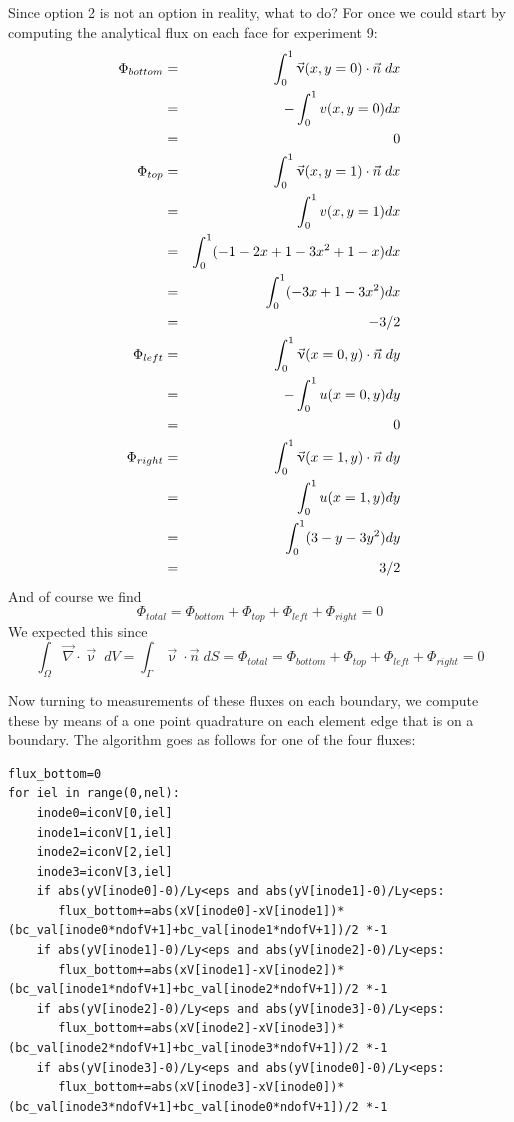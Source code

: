 Since option 2 is not an option in reality, what to do? 
For once we could start by computing the analytical flux on each face for experiment 9:
\begin{eqnarray}
\Phi_{bottom} 
&=& \int_0^1 \vec{\upnu}(x,y=0) \cdot \vec{n} \; dx \nonumber\\
&=& -\int_0^1 v(x,y=0)  dx \nonumber\\
&=& 0 \nonumber\\
\Phi_{top} 
&=& \int_0^1 \vec{\upnu}(x,y=1) \cdot \vec{n} \; dx \nonumber\\
&=& \int_0^1 v(x,y=1)  dx \nonumber\\
&=& \int_0^1 ( -1-2x+1 -3x^2 + 1 - x ) dx \nonumber\\
&=& \int_0^1 ( -3x+1 -3x^2   ) dx \nonumber\\
&=& -3/2 \nonumber\\
\Phi_{left} 
&=& \int_0^1 \vec{\upnu}(x=0,y) \cdot \vec{n} \; dy \nonumber\\
&=& -\int_0^1 u(x=0,y)  dy \nonumber\\
&=& 0 \nonumber\\
\Phi_{right} 
&=& \int_0^1 \vec{\upnu}(x=1,y) \cdot \vec{n} \; dy \nonumber\\
&=& \int_0^1 u(x=1,y)  dy \nonumber\\
&=& \int_0^1 (3  - y - 3y^2  ) dy \nonumber\\
&=& 3/2 \nonumber
\end{eqnarray}
And of course we find 
\[
\Phi_{total}=\Phi_{bottom}+\Phi_{top} +\Phi_{left}  + \Phi_{right}  =0
\] 
We expected this since
\[
\int_\Omega \vec{\nabla}\cdot \vec{\upnu} \; dV 
= \int_\Gamma \vec{\upnu} \cdot \vec{n} \; dS
=\Phi_{total}=\Phi_{bottom}+\Phi_{top} +\Phi_{left}  + \Phi_{right}  =0
\]

Now turning to measurements of these fluxes on each boundary,
we compute these by means of a one point quadrature on each 
element edge that is on a boundary.
The algorithm goes as follows for one of the four fluxes:
\begin{lstlisting}
flux_bottom=0
for iel in range(0,nel):
    inode0=iconV[0,iel]
    inode1=iconV[1,iel]
    inode2=iconV[2,iel]
    inode3=iconV[3,iel]
    if abs(yV[inode0]-0)/Ly<eps and abs(yV[inode1]-0)/Ly<eps:
       flux_bottom+=abs(xV[inode0]-xV[inode1])*(bc_val[inode0*ndofV+1]+bc_val[inode1*ndofV+1])/2 *-1
    if abs(yV[inode1]-0)/Ly<eps and abs(yV[inode2]-0)/Ly<eps:
       flux_bottom+=abs(xV[inode1]-xV[inode2])*(bc_val[inode1*ndofV+1]+bc_val[inode2*ndofV+1])/2 *-1
    if abs(yV[inode2]-0)/Ly<eps and abs(yV[inode3]-0)/Ly<eps:
       flux_bottom+=abs(xV[inode2]-xV[inode3])*(bc_val[inode2*ndofV+1]+bc_val[inode3*ndofV+1])/2 *-1
    if abs(yV[inode3]-0)/Ly<eps and abs(yV[inode0]-0)/Ly<eps:
       flux_bottom+=abs(xV[inode3]-xV[inode0])*(bc_val[inode3*ndofV+1]+bc_val[inode0*ndofV+1])/2 *-1
\end{lstlisting}
 

